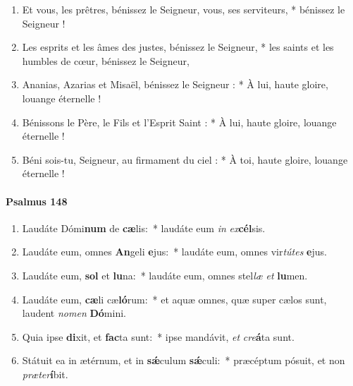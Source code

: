 \documentclass[twoside]{article}
\begin{document}
\begin{paracol}[1]{2}
\begin{enumerate}[wide, itemsep=0mm, labelwidth=!, labelindent=0pt, label=\color{gregoriocolor}\theenumi]
\item Et vous, les prêtres,
   bénissez le Seigneur,
vous, ses serviteurs, *
   bénissez le Seigneur !

\item Les esprits et les âmes des justes,
   bénissez le Seigneur, *
 les saints et les humbles de cœur,
   bénissez le Seigneur,
\item Ananias, Azarias et Misaël,
   bénissez le Seigneur : *
À lui, haute gloire, louange éternelle !

\item Bénissons le Père, le Fils et l'Esprit Saint : *
À lui, haute gloire, louange éternelle !

\item Béni sois-tu, Seigneur, au firmament du ciel : *
À toi, haute gloire, louange éternelle !
\end{enumerate}

\switchcolumn*
\paragraph{Psalmus 148}


\begin{enumerate}[wide, itemsep=0mm, labelwidth=!, labelindent=0pt, label=\color{gregoriocolor}\theenumi]
\item Laudáte Dómi\textbf{num} de \textbf{cæ}lis:~* laudáte eum \textit{in} \textit{ex}\textbf{cél}sis.

\item Laudáte eum, omnes \textbf{An}geli \textbf{e}jus:~* laudáte eum, omnes vir\textit{tú}\textit{tes} \textbf{e}jus.

\item Laudáte eum, \textbf{sol} et \textbf{lu}na:~* laudáte eum, omnes stel\textit{læ} \textit{et} \textbf{lu}men.

\item Laudáte eum, \textbf{cæ}li cæ\textbf{ló}rum:~* et aquæ omnes, quæ super cælos sunt, laudent \textit{no}\textit{men} \textbf{Dó}mini.

\item Quia ipse \textbf{di}xit, et \textbf{fac}ta sunt:~* ipse mandávit, \textit{et} \textit{cre}\textbf{á}ta sunt.

\item Státuit ea in ætérnum, et in \textbf{sǽ}culum \textbf{sǽ}culi:~* præcéptum pósuit, et non \textit{præ}\textit{ter}\textbf{í}bit.


\end{enumerate}
\end{paracol}
\end{document}
